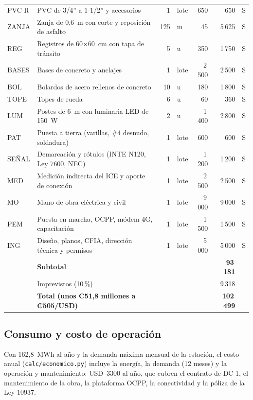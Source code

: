 {\begin{longtable}{L{1.4cm}L{7.4cm}rL{0.8cm}rrL{0.9cm}}
PVC-R & PVC de 3/4'' a 1-1/2'' y accesorios & 1 & lote & 650 & 650 & S\\
ZANJA & Zanja de 0,6~m con corte y reposición de asfalto & 125 & m & 45 & 5\,625 & S\\
REG & Registros de 60$\times$60~cm con tapa de tránsito & 5 & u & 350 & 1\,750 & S\\
BASES & Bases de concreto y anclajes & 1 & lote & 2\,500 & 2\,500 & S\\
BOL & Bolardos de acero rellenos de concreto & 10 & u & 180 & 1\,800 & S\\
TOPE & Topes de rueda & 6 & u & 60 & 360 & S\\
LUM & Postes de 6~m con luminaria LED de 150~W & 2 & u & 1\,400 & 2\,800 & S\\
PAT & Puesta a tierra (varillas, \#4 desnudo, soldadura) & 1 & lote & 600 & 600 & S\\
SEÑAL & Demarcación y rótulos (INTE N120, Ley 7600, NEC) & 1 & lote & 1\,200 & 1\,200 & S\\
MED & Medición indirecta del ICE y aporte de conexión & 1 & lote & 2\,500 & 2\,500 & S\\
MO & Mano de obra eléctrica y civil & 1 & lote & 9\,000 & 9\,000 & S\\
PEM & Puesta en marcha, OCPP, módem 4G, capacitación & 1 & lote & 1\,500 & 1\,500 & S\\
ING & Diseño, planos, CFIA, dirección técnica y permisos & 1 & lote & 5\,000 & 5\,000 & S\\
\midrule
 & \textbf{Subtotal} & & & & \textbf{93\,181} & \\
 & Imprevistos (10\,\%) & & & & 9\,318 & \\
 & \textbf{Total (unos ₡51,8 millones a ₡505/USD)} & & & & \textbf{102\,499} & \\
\bottomrule
\end{longtable}}

\subsection{Consumo y costo de operación}
\label{sec:economia}
Con 162,8~MWh al año y la demanda máxima mensual de la estación, el costo anual (\texttt{calc/economico.py}) incluye la energía, la demanda (12 meses) y la operación y mantenimiento: USD~3300 al año, que cubren el contrato de DC-1, el mantenimiento de la obra, la plataforma OCPP, la conectividad y la póliza de la Ley 10937.


